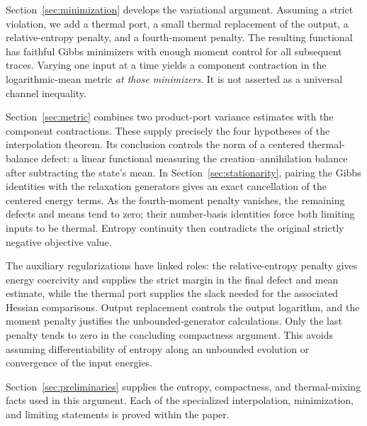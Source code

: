 Section~\ref{sec:minimization} develops the variational argument. Assuming a strict violation, we add a thermal port, a small thermal replacement of the output, a relative-entropy penalty, and a fourth-moment penalty. The resulting functional has faithful Gibbs minimizers with enough moment control for all subsequent traces. Varying one input at a time yields a component contraction in the logarithmic-mean metric \emph{at those minimizers}. It is not asserted as a universal channel inequality.

Section~\ref{sec:metric} combines two product-port variance estimates with the component contractions. These supply precisely the four hypotheses of the interpolation theorem. Its conclusion controls the norm of a centered thermal-balance defect: a linear functional measuring the creation--annihilation balance after subtracting the state's mean. In Section~\ref{sec:stationarity}, pairing the Gibbs identities with the relaxation generators gives an exact cancellation of the centered energy terms. As the fourth-moment penalty vanishes, the remaining defects and means tend to zero; their number-basis identities force both limiting inputs to be thermal. Entropy continuity then contradicts the original strictly negative objective value.

The auxiliary regularizations have linked roles: the relative-entropy penalty gives energy coercivity and supplies the strict margin in the final defect and mean estimate, while the thermal port supplies the slack needed for the associated Hessian comparisons. Output replacement controls the output logarithm, and the moment penalty justifies the unbounded-generator calculations. Only the last penalty tends to zero in the concluding compactness argument. This avoids assuming differentiability of entropy along an unbounded evolution or convergence of the input energies.

Section~\ref{sec:preliminaries} supplies the entropy, compactness, and thermal-mixing facts used in this argument. Each of the specialized interpolation, minimization, and limiting statements is proved within the paper.
